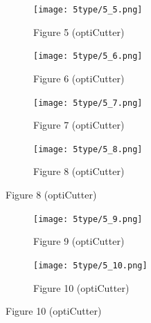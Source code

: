 \documentclass[a4paper]{article}
\begin{document}
\begin{figure}[H] %
  \centering
  \captionsetup{justification=centering, font=small} %
  \begin{subfigure}[b]{0.48\textwidth}
    \centering
    \texttt{[image: 5type/5\_5.png]}
    \caption{Figure 5 (optiCutter) }
    \label{fig:5}
    \hfill
  \end{subfigure}
  \begin{subfigure}[b]{0.48\textwidth}
    \centering
    \texttt{[image: 5type/5\_6.png]}
    \caption{Figure 6 (optiCutter) }
    \label{fig:6}
  \end{subfigure}
  
  \vspace{0.1cm}
  
  \begin{subfigure}[b]{0.48\textwidth}
    \centering
    \texttt{[image: 5type/5\_7.png]}
    \caption{Figure 7 (optiCutter) }
    \label{fig:7}
    \end{subfigure}
    \hfill
  \begin{subfigure}[b]{0.48\textwidth}
    \centering
    \texttt{[image: 5type/5\_8.png]}
    \caption{Figure 8 (optiCutter) }
    \label{fig:8}
  \end{subfigure}


 
  \label{fig:all_images_part2}
\end{figure}
\begin{figure}[H] %
  \centering
  \captionsetup{justification=centering, font=small} %

  \begin{subfigure}[b]{0.48\textwidth}
    \centering
    \texttt{[image: 5type/5\_9.png]}
    \caption{Figure 9 (optiCutter) }
    \label{fig:9}
  \end{subfigure}
  \hfill
  \begin{subfigure}[b]{0.48\textwidth}
    \centering
    \texttt{[image: 5type/5\_10.png]}
    \caption{Figure 10 (optiCutter) }
    \label{fig:10}
  \end{subfigure}
  \label{fig:all_images_part2}
\end{figure}
\end{document}
